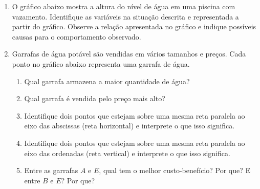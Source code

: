 \begin{enumerate}
\item O gráfico abaixo mostra a altura do nível de água em uma piscina com vazamento. Identifique as variáveis na situação descrita e representada a partir do gráfico. Observe a relação apresentada no gráfico e indique possíveis causas para o comportamento observado.
\begin{center}\end{center}

\item Garrafas de água potável são vendidas em vários tamanhos e preços. Cada ponto no gráfico abaixo representa uma garrafa de água.
\begin{center}\end{center}\begin{enumerate}
\item {} 
Qual garrafa armazena a maior quantidade de água?

\item {} 
Qual garrafa é vendida pelo preço mais alto?

\item {} 
Identifique dois pontos que estejam sobre uma mesma reta paralela ao eixo das abscissas (reta horizontal) e interprete o que isso significa.

\item {} 
Identifique dois pontos que estejam sobre uma mesma reta paralela ao eixo das ordenadas (reta vertical) e interprete o que isso significa.

\item {} 
Entre as garrafas \(A\) e \(E\), qual tem o melhor custo-benefício? Por que? E entre \(B\) e \(E\)? Por que?

\end{enumerate}
\end{enumerate}


